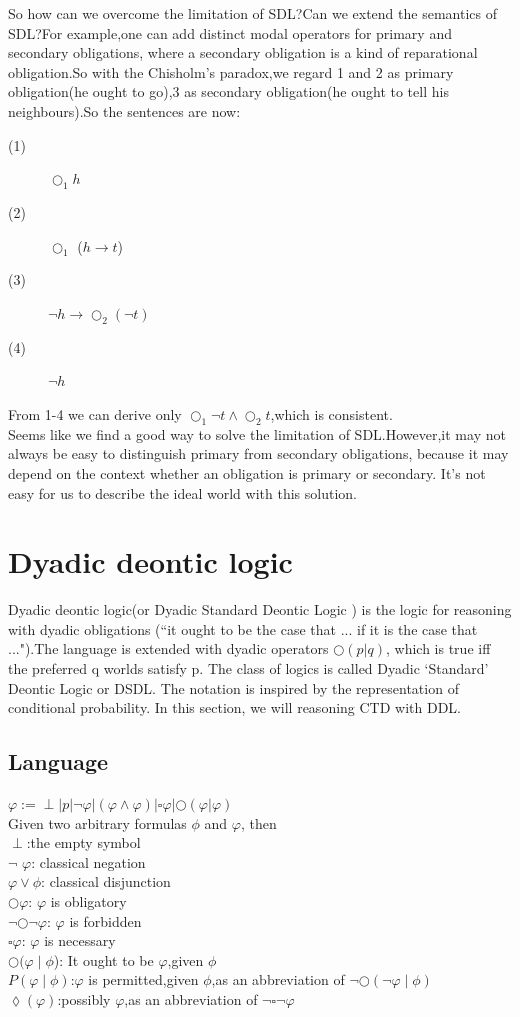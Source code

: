 \documentclass{article}
\begin{document}
So how can we overcome the limitation of SDL?Can we extend the semantics of SDL?For example,one can add distinct modal operators for primary and secondary obligations, where a secondary obligation is a kind of reparational obligation.So with the Chisholm’s paradox,we regard 1 and 2 as primary obligation(he ought to go),3 as secondary obligation(he ought to tell his neighbours).So the sentences are now:
\begin{description}
\item[(1)] $\bigcirc_{1} h$
\item[(2)]$\bigcirc_{1}$ ($h \to t $)
\item[(3)]$\neg h \to \bigcirc_ {2} (\neg t)$
\item[(4)]$\neg h$
\end{description}
From 1-4 we can derive only $\bigcirc_{1} \neg t \wedge \bigcirc_{2} t$,which is consistent.\\
Seems like we find a good way to solve the limitation of SDL.However,it may not always be easy to distinguish primary from secondary obligations, because it may depend on the context whether an obligation is primary or secondary. It's not easy for us to describe the ideal world with this solution. 
\section{Dyadic deontic logic}
Dyadic deontic logic(or Dyadic Standard Deontic Logic ) is the logic for reasoning with dyadic obligations (“it ought to be the case that ... if it is the case that ...").The language is extended with dyadic operators 
 $\bigcirc(p|q)$, which is true iff the preferred q worlds satisfy p. The class of logics is called Dyadic ‘Standard’ Deontic Logic or DSDL. The notation is inspired by the representation of conditional probability.
In this section, we will reasoning CTD with DDL.
\subsection{Language}
$\varphi := \perp | p | \neg \varphi |(\varphi \wedge \varphi)|\square \varphi |\bigcirc(\varphi|\varphi)$\\
Given two arbitrary formulas $\phi$  and $\varphi$, then\\
$\perp$:the empty symbol\\
$\neg$ $\varphi$: classical negation\\
$\varphi \vee  \phi $: classical disjunction\\
$\bigcirc \varphi $: $\varphi$ is obligatory\\
$ \neg \bigcirc\neg\varphi$: $ \varphi$ is forbidden\\
$ \square\varphi$: $\varphi$ is necessary\\
$\bigcirc(\varphi\mid\phi$): It ought to be $\varphi$,given $\phi$\\
$P(\varphi\mid\phi) $:$\varphi$ is permitted,given $\phi$,as an abbreviation of $\neg\bigcirc(\neg\varphi\mid\phi)$\\
$\lozenge(\varphi)$:possibly $\varphi$,as an abbreviation of $\neg\square\neg\varphi$\\
\end{document}
